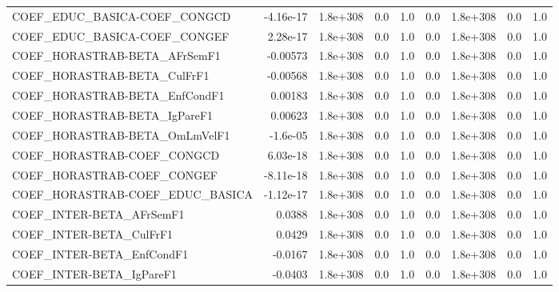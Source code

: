 \begin{tabular}{lrrrrrrrr}
COEF\_EDUC\_BASICA-COEF\_CONGCD          &   -4.16e-17 &     1.8e+308 &     0.0 &      1.0 &        0.0 &    1.8e+308 &          0.0 &           1.0 \\
COEF\_EDUC\_BASICA-COEF\_CONGEF          &    2.28e-17 &     1.8e+308 &     0.0 &      1.0 &        0.0 &    1.8e+308 &          0.0 &           1.0 \\
COEF\_HORASTRAB-BETA\_AFrSemF1          &    -0.00573 &     1.8e+308 &     0.0 &      1.0 &        0.0 &    1.8e+308 &          0.0 &           1.0 \\
COEF\_HORASTRAB-BETA\_CulFrF1           &    -0.00568 &     1.8e+308 &     0.0 &      1.0 &        0.0 &    1.8e+308 &          0.0 &           1.0 \\
COEF\_HORASTRAB-BETA\_EnfCondF1         &     0.00183 &     1.8e+308 &     0.0 &      1.0 &        0.0 &    1.8e+308 &          0.0 &           1.0 \\
COEF\_HORASTRAB-BETA\_IgPareF1          &     0.00623 &     1.8e+308 &     0.0 &      1.0 &        0.0 &    1.8e+308 &          0.0 &           1.0 \\
COEF\_HORASTRAB-BETA\_OmLmVelF1         &    -1.6e-05 &     1.8e+308 &     0.0 &      1.0 &        0.0 &    1.8e+308 &          0.0 &           1.0 \\
COEF\_HORASTRAB-COEF\_CONGCD            &    6.03e-18 &     1.8e+308 &     0.0 &      1.0 &        0.0 &    1.8e+308 &          0.0 &           1.0 \\
COEF\_HORASTRAB-COEF\_CONGEF            &   -8.11e-18 &     1.8e+308 &     0.0 &      1.0 &        0.0 &    1.8e+308 &          0.0 &           1.0 \\
COEF\_HORASTRAB-COEF\_EDUC\_BASICA       &   -1.12e-17 &     1.8e+308 &     0.0 &      1.0 &        0.0 &    1.8e+308 &          0.0 &           1.0 \\
COEF\_INTER-BETA\_AFrSemF1              &      0.0388 &     1.8e+308 &     0.0 &      1.0 &        0.0 &    1.8e+308 &          0.0 &           1.0 \\
COEF\_INTER-BETA\_CulFrF1               &      0.0429 &     1.8e+308 &     0.0 &      1.0 &        0.0 &    1.8e+308 &          0.0 &           1.0 \\
COEF\_INTER-BETA\_EnfCondF1             &     -0.0167 &     1.8e+308 &     0.0 &      1.0 &        0.0 &    1.8e+308 &          0.0 &           1.0 \\
COEF\_INTER-BETA\_IgPareF1              &     -0.0403 &     1.8e+308 &     0.0 &      1.0 &        0.0 &    1.8e+308 &          0.0 &           1.0 \\

\end{tabular}
